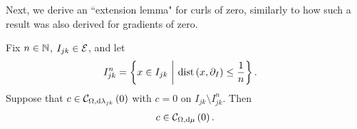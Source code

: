 Next, we derive an ``extension lemma" for curls of zero, similarly to how such a result was also derived for gradients of zero.
\begin{lemma} \label{lem:CurlZeroExtensionLemma}
	Fix $n\in\mathbb{N}$, $I_{jk}\in\mathcal{E}$, and let 
	\begin{align*}
		I_{jk}^n &= \left\{ x\in I_{jk} \ \middle\vert \  \mathrm{dist}\left( x, \partial_I \right) \leq \frac{1}{n} \right\}.
	\end{align*}
	Suppose that $c\in\mathcal{C}_{ \Omega, \mathrm{d}\lambda_{jk}}\left( 0 \right)$ with $c=0$ on $I_{jk}\setminus I_{jk}^n$.
	Then
	\begin{align*}
		c\in\mathcal{C}_{ \Omega, \mathrm{d}\mu}\left( 0 \right).
	\end{align*}
\end{lemma}
